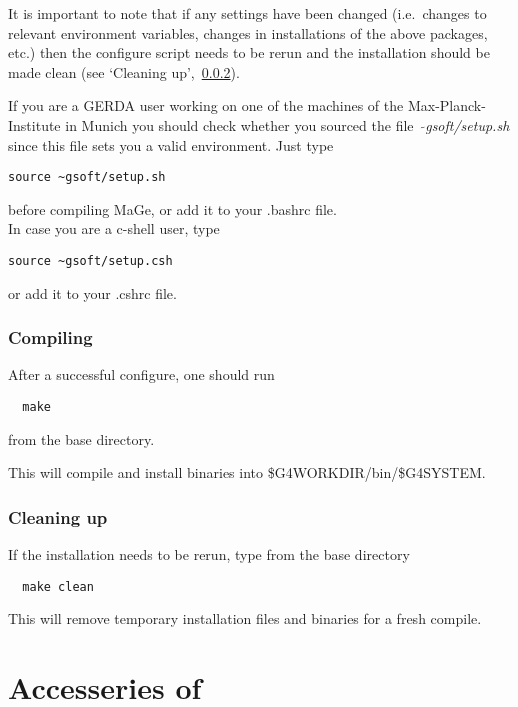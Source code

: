 It is important to note that if any settings have been changed
(i.e.~changes to relevant environment variables, changes in
installations of the above packages, etc.) then the configure script
needs to be rerun and the installation should be made clean (see
`Cleaning up',~\ref{sec:InstMakeClean}).


If you are a GERDA user working on one of the machines of the Max-Planck-Institute in Munich %
you should check whether you sourced the file \ 
{\textit{$\tilde{}$gsoft/setup.sh} } since this file sets you a valid
environment. Just type
\begin{lstlisting}
source ~gsoft/setup.sh
\end{lstlisting}
before compiling MaGe, or add it to your .bashrc file.\\
In case you are a c-shell user, type
\begin{lstlisting}
source ~gsoft/setup.csh
\end{lstlisting}
or add it to your .cshrc file.

\subsubsection{Compiling}

After a successful configure, one should run

\begin{lstlisting}
  make
\end{lstlisting}

from the \mage base directory.  

This will compile and install binaries into \$G4WORKDIR/bin/\$G4SYSTEM.

\subsubsection{Cleaning up}\label{sec:InstMakeClean}

If the installation needs to be rerun, type from the \mage base directory

\begin{lstlisting}
  make clean
\end{lstlisting}

This will remove temporary installation files and binaries for a fresh compile.

\section{Accesseries of \mage} 
